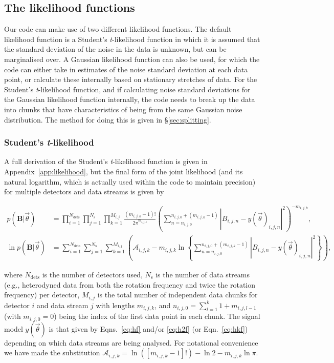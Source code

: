 \subsection{The likelihood functions}\label{sec:likelihood}

Our code can make use of two different likelihood functions. The default likelihood function is a
Student's {\it t}-likelihood function in which it is assumed that the standard deviation of the noise in the
data is unknown, but can be marginalised over. A Gaussian likelihood function can also be used, for
which the code can either take in estimates of the noise standard deviation at each data point, or calculate
these internally based on stationary stretches of data. For the Student's {\it t}-likelihood function, and if
calculating noise standard deviations for the Gaussian likelihood function internally, the code needs to break
up the data into chunks that have characteristics of being from the same Gaussian noise distribution. The method for doing this is
given in \S\ref{sec:splitting}.

\subsubsection{Student's {\it t}-likelihood}\label{sec:stlikelihood}

A full derivation of the Student's {\it t}-likelihood function \citep[see, e.g.,][]{2005PhRvD..72j2002D} is given
in Appendix~\ref{app:likelihood}, but the final form of the joint likelihood (and its natural logarithm,
which is actually used within the code to maintain precision) for multiple detectors and data streams is
given by
\begin{widetext}
\begin{align}\label{eq:stlikelihood}
p(\mathbf{B}|\vec{\theta}) &= \prod_{i=1}^{N_{\text{dets}}} \prod_{j=1}^{N_{\text{s}}} \prod_{k=1}^{M_{i,j}}
\frac{(m_{i,j,k}-1)!}{2\pi^{m_{i,j,k}}}
\left(\sum_{n=n_{i,j,0}}^{n_{i,j,0}+(m_{i,j,k}-1)} |B_{i,j,n}-y(\vec{\theta})_{i,j,n}|^2\right)^{-m_{i,j,k}},
\nonumber \\
\ln{p(\mathbf{B}|\vec{\theta})} &= \sum_{i=1}^{N_{\text{dets}}} \sum_{j=1}^{N_{\text{s}}}
\sum_{k=1}^{M_{i,j}} \left( \mathcal{A}_{i,j,k} - m_{i,j,k}\ln{
\left\{\sum_{n=n_{i,j,0}}^{n_{i,j,0}+(m_{i,j,k}-1)} |B_{i,j,n}-y(\vec{\theta})_{i,j,n}|^2\right\}}
\right),
\end{align}
\end{widetext}
where $N_{\text{dets}}$ is the number of detectors used, $N_{\text{s}}$ is the number of data streams (e.g.,
heterodyned data from both the rotation frequency and twice the rotation frequency) per detector, $M_{i,j}$ is
the total number of independent data chunks for detector $i$ and data stream $j$ with lengths $m_{i,j,k}$, and
$n_{i,j,0} = \sum_{l=1}^{k} 1+m_{i,j,l-1}$ (with $m_{i,j,0} = 0$) being the index of the first data point in
each chunk. The signal model $y(\vec{\theta})$ is that given by Eqns.~\ref{eq:hf} and/or \ref{eq:h2f} (or Eqn.~\ref{eq:hkf})
depending on which data streams are being analysed. For notational convenience we have made the substitution
$\mathcal{A}_{i,j,k} = \ln{\left([m_{i,j,k}-1]!\right)} - \ln{2} - m_{i,j,k}\ln{\pi}$.

